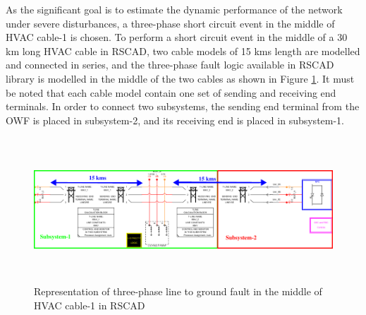 As the significant goal is to estimate the dynamic performance of the network under severe disturbances, a three-phase short circuit event in the middle of \gls{HVAC} cable-1 is chosen. To perform a short circuit event in the middle of a 30 km long \gls{HVAC} cable in RSCAD, two cable models of 15 kms length are modelled and connected in series, and the three-phase fault logic available in RSCAD library is modelled in the middle of the two cables as shown in Figure \ref{fig:Subsystem_Trial}. It must be noted that each cable model contain one set of sending and receiving end terminals. In order to connect two subsystems, the sending end terminal from the \gls{OWF} is placed in subsystem-2, and its receiving end is placed in subsystem-1. %

\begin{figure}[H]
\centering
    \includegraphics[height = 5.4cm,width = 17cm]{Diagrams/Chapter_4/subsystem_fault_mark.pdf}
    \caption{Representation of three-phase line to ground fault in the middle of HVAC cable-1 in RSCAD}
    \label{fig:Subsystem_Trial}
\end{figure}

